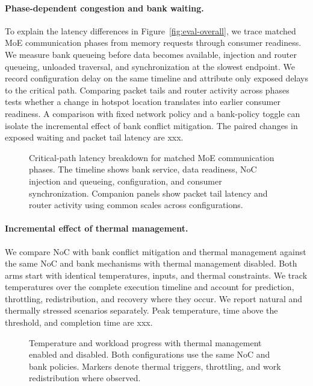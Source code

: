 \documentclass[conference,10pt]{IEEEtran}
\newcommand{\Description}[1]{}
\begin{document}
\paragraph{Phase-dependent congestion and bank waiting.}
To explain the latency differences in Figure~\ref{fig:eval-overall}, we trace matched MoE communication phases from memory requests through consumer readiness. We measure bank queueing before data becomes available, injection and router queueing, unloaded traversal, and synchronization at the slowest endpoint. We record configuration delay on the same timeline and attribute only exposed delays to the critical path. Comparing packet tails and router activity across phases tests whether a change in hotspot location translates into earlier consumer readiness. A comparison with fixed network policy and a bank-policy toggle can isolate the incremental effect of bank conflict mitigation. The paired changes in exposed waiting and packet tail latency are xxx.

\begin{figure}[t]
\centering
\fbox{\rule{0pt}{17mm}\rule{0.92\textwidth}{0pt}}
\caption{Critical-path latency breakdown for matched MoE communication phases. The timeline shows bank service, data readiness, NoC injection and queueing, configuration, and consumer synchronization. Companion panels show packet tail latency and router activity using common scales across configurations.}
\Description{Reserved space for the critical-path breakdown and congestion panels.}
\label{fig:eval-breakdown}
\end{figure}

\paragraph{Incremental effect of thermal management.}
We compare NoC with bank conflict mitigation and thermal management against the same NoC and bank mechanisms with thermal management disabled. Both arms start with identical temperatures, inputs, and thermal constraints. We track temperatures over the complete execution timeline and account for prediction, throttling, redistribution, and recovery where they occur. We report natural and thermally stressed scenarios separately. Peak temperature, time above the threshold, and completion time are xxx.

\begin{figure}[t]
\centering
\fbox{\rule{0pt}{17mm}\rule{0.90\columnwidth}{0pt}}
\caption{Temperature and workload progress with thermal management enabled and disabled. Both configurations use the same NoC and bank policies. Markers denote thermal triggers, throttling, and work redistribution where observed.}
\Description{Reserved space for temperature and workload progress curves.}
\label{fig:eval-thermal}
\end{figure}
\end{document}
